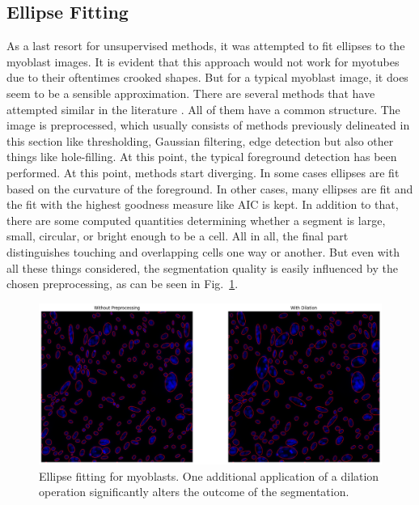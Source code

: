 \subsection{Ellipse Fitting}
As a last resort for unsupervised methods, it was attempted to fit ellipses to the myoblast images. It is evident that this approach would not work for myotubes due to their oftentimes crooked shapes. But for a typical myoblast image, it does seem to be a sensible approximation. There are several methods that have attempted similar in the literature \cite{panagiotakis2020region, panagiotakis2018cell, kothari2009automated}. All of them have a common structure. The image is preprocessed, which usually consists of methods previously delineated in this section like thresholding, Gaussian filtering, edge detection but also other things like hole-filling. At this point, the typical foreground detection has been performed. At this point, methods start diverging. In some cases ellipses are fit based on the curvature of the foreground. In other cases, many ellipses are fit and the fit with the highest goodness measure like AIC is kept. In addition to that, there are some computed quantities determining whether a segment is large, small, circular, or bright enough to be a cell. All in all, the final part distinguishes touching and overlapping cells one way or another. But even with all these things considered, the segmentation quality is easily influenced by the chosen preprocessing, as can be seen in Fig.~\ref{figellipsefitting}. 
\begin{figure}
	\centering
	\includegraphics[width=\textwidth]{"images/ellipsefitting.png"}
	\caption[Ellipse Fitting as segmentation]{Ellipse fitting for myoblasts. One additional application of a dilation operation significantly alters the outcome of the segmentation.}
	\label{figellipsefitting}
\end{figure}
